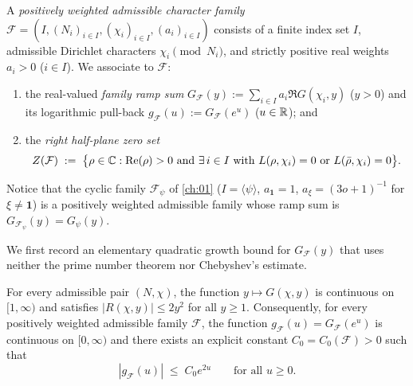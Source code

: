 \begin{definition}
\label{def:02:char-family}
A \emph{positively weighted admissible character family} $\mathcal{F} = (I, (N_i)_{i\in I}, (\chi_i)_{i\in I}, (a_i)_{i\in I})$ consists of a finite index set $I$, admissible Dirichlet characters $\chi_i \pmod{N_i}$, and strictly positive real weights $a_i > 0$ ($i \in I$). We associate to $\mathcal{F}$:
\begin{enumerate}[label=\textup{(\roman*)}]
\item the real-valued \emph{family ramp sum} $G_{\mathcal{F}}(y) := \sum_{i \in I} a_i \Re G(\chi_i, y)$ ($y > 0$) and its logarithmic pull-back $g_{\mathcal{F}}(u) := G_{\mathcal{F}}(e^u)$ ($u \in \mathbb{R}$); and
\item the \emph{right half-plane zero set}
  \begin{equation}
  \label{eq:02:zero-set}
    Z(\mathcal{F}) \;:=\; \bigl\{\rho \in \mathbb{C} : \operatorname{Re}(\rho) > 0 \text{ and } \exists\, i \in I \text{ with } L(\rho, \chi_i) = 0 \text{ or } L(\bar{\rho}, \chi_i) = 0\bigr\}.
  \end{equation}
\end{enumerate}
\end{definition}

Notice that the cyclic family $\mathcal{F}_\psi$ of \cref{ch:01} ($I = \langle \psi \rangle$, $a_{\mathbf{1}} = 1$, $a_\xi = (3o+1)^{-1}$ for $\xi \neq \mathbf{1}$) is a positively weighted admissible family whose ramp sum is $G_{\mathcal{F}_\psi}(y) = G_\psi(y)$.

We first record an elementary quadratic growth bound for $G_{\mathcal{F}}(y)$ that uses neither the prime number theorem nor Chebyshev's estimate.

\begin{lemma}
\label{lem:02:growth}
For every admissible pair $(N, \chi)$, the function $y \mapsto G(\chi, y)$ is continuous on $[1, \infty)$ and satisfies $|R(\chi, y)| \le 2y^2$ for all $y \ge 1$. Consequently, for every positively weighted admissible family $\mathcal{F}$, the function $g_{\mathcal{F}}(u) = G_{\mathcal{F}}(e^u)$ is continuous on $[0, \infty)$ and there exists an explicit constant $C_0 = C_0(\mathcal{F}) > 0$ such that
\begin{equation}
\label{eq:02:quad-growth}
  |g_{\mathcal{F}}(u)| \;\le\; C_0 e^{2u} \qquad \text{for all } u \ge 0.
\end{equation}
\end{lemma}

